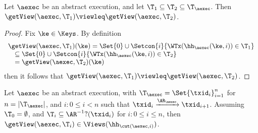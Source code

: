 \begin{lemma}
\label{lem:getView.monotone}
Let $\aexec$ be an abstract execution, and let $\T_1 \subseteq \T_2 \subseteq \T_{\aexec}$. 
Then $\getView(\aexec, \T_1) \viewleq \getView(\aexec, \T_2)$.
\end{lemma}
\begin{proof}
Fix $\ke \in \Keys$. By definition  
\[
\begin{array}{l}
    \getView(\aexec, \T_1)(\ke) = \Set{0} \cup \Setcon{ i }{\WTx(\hh_{\aexec}(\ke, i)) \in \T_1} \\
    \quad \subseteq \Set{0} \cup \Setcon{i }{ \WTx(\hh_{\aexec}(\ke, i)) \in \T_2} \\
\quad = \getView(\aexec, \T_2)(\ke)
\end{array}
\]
then it follows that  $\getView(\aexec, \T_1) \viewleq \getView(\aexec, \T_2)$.
\end{proof}

\begin{lemma}
\label{lem:cut.views}
Let $\aexec$ be an abstract execution, with $\T_{\aexec} = \Set{\txid_{i}}_{i = 1}^{n}$ for 
$n = \lvert \T_{\aexec} \rvert$, and \( i : 0 \leq i < n\) such that $\txid_{i} \xrightarrow{\AR_{\aexec}} \txid_{i+1}$.
Assuming $\T_{0} = \emptyset$, and $\T_{i} \subseteq \AR^{-1}?(\txid_{i})$ for $i : 0 \leq i \leq n$,
then $\getView(\aexec, \T_{i}) \in \Views(\hh_{\cut(\aexec, i)})$.
\end{lemma}

